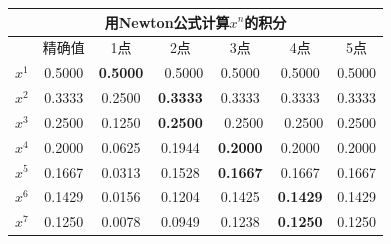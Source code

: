 \documentclass{ctexart}
\begin{document}
\begin{enumerate}
\begin{tabular}{|c|c|c|c|c|c|c|}
\hline
\multicolumn{7}{|c|}{用Newton公式计算\(x^n\)的积分}\\ 
\hline
&精确值 &1点 &2点 &3点 &4点 &5点 \\
\hline
\(x^1\) &0.5000 &\bf 0.5000 &\ 0.5000 &0.5000 &0.5000 &0.5000 \\
\hline
\(x^2\) &0.3333 &0.2500 &\bf 0.3333&  0.3333 &0.3333 &0.3333 \\
\hline
\(x^3\) &0.2500 &0.1250 &\bf 0.2500 & \ 0.2500 &\ 0.2500 &0.2500 \\
\hline
\(x^4\) &0.2000 &0.0625 &0.1944 &\bf 0.2000 &0.2000 & 0.2000 \\
\hline
\(x^5\) &0.1667 &0.0313 &0.1528&\bf 0.1667 &0.1667 & 0.1667 \\
\hline
\(x^6\) &0.1429 &0.0156 &0.1204 &0.1425 &\bf 0.1429&0.1429 \\
\hline
\(x^7\) &0.1250 &0.0078 &0.0949 &0.1238 &\bf 0.1250 & 0.1250 \\
\hline
\end{tabular}
  





















\end{enumerate}
\end{document}

